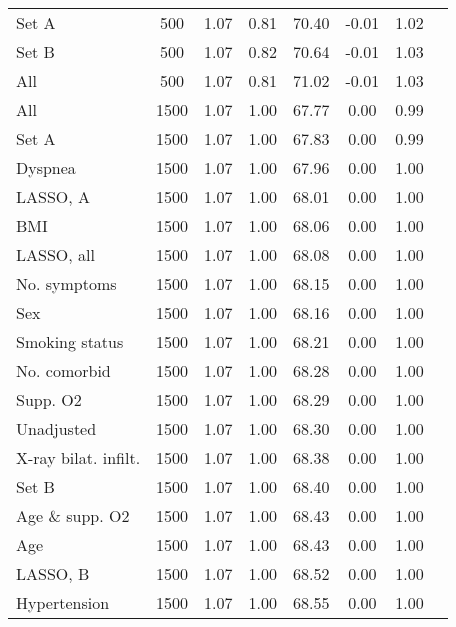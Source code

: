 \documentclass{article}
\begin{document}
{\begin{longtable}{lccccccc}
Set A & 500 & 1.07 & 0.81 & 70.40 & -0.01 & 1.02\\
Set B & 500 & 1.07 & 0.82 & 70.64 & -0.01 & 1.03\\
All & 500 & 1.07 & 0.81 & 71.02 & -0.01 & 1.03\\ \midrule
All & 1500 & 1.07 & 1.00 & 67.77 & 0.00 & 0.99\\
Set A & 1500 & 1.07 & 1.00 & 67.83 & 0.00 & 0.99\\
Dyspnea & 1500 & 1.07 & 1.00 & 67.96 & 0.00 & 1.00\\
LASSO, A & 1500 & 1.07 & 1.00 & 68.01 & 0.00 & 1.00\\
BMI & 1500 & 1.07 & 1.00 & 68.06 & 0.00 & 1.00\\
LASSO, all & 1500 & 1.07 & 1.00 & 68.08 & 0.00 & 1.00\\
No. symptoms & 1500 & 1.07 & 1.00 & 68.15 & 0.00 & 1.00\\
Sex & 1500 & 1.07 & 1.00 & 68.16 & 0.00 & 1.00\\
Smoking status & 1500 & 1.07 & 1.00 & 68.21 & 0.00 & 1.00\\
No. comorbid & 1500 & 1.07 & 1.00 & 68.28 & 0.00 & 1.00\\
Supp. O2 & 1500 & 1.07 & 1.00 & 68.29 & 0.00 & 1.00\\
Unadjusted & 1500 & 1.07 & 1.00 & 68.30 & 0.00 & 1.00\\
X-ray bilat. infilt. & 1500 & 1.07 & 1.00 & 68.38 & 0.00 & 1.00\\
Set B & 1500 & 1.07 & 1.00 & 68.40 & 0.00 & 1.00\\
Age \& supp. O2 & 1500 & 1.07 & 1.00 & 68.43 & 0.00 & 1.00\\
Age & 1500 & 1.07 & 1.00 & 68.43 & 0.00 & 1.00\\
LASSO, B & 1500 & 1.07 & 1.00 & 68.52 & 0.00 & 1.00\\
Hypertension & 1500 & 1.07 & 1.00 & 68.55 & 0.00 & 1.00\\
\bottomrule
\hline
\end{longtable}
}

\clearpage
\end{document}
